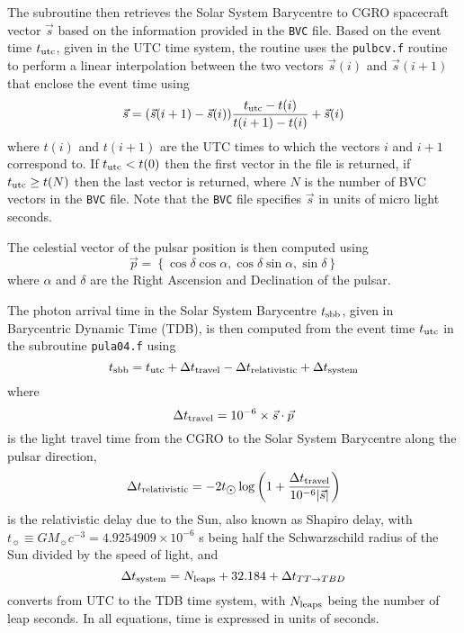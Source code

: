 \documentclass{article}[12pt,a4]
\begin{document}
The subroutine then retrieves the Solar System Barycentre to CGRO spacecraft vector $\vec{s}$ based on the
information provided in the {\tt BVC} file.
Based on the event time $t_{\rm utc}$, given in the UTC time system, the routine uses the {\tt pulbcv.f} routine
to perform a linear interpolation between the two vectors $\vec{s}(i)$ and $\vec{s}(i+1)$ that enclose the event
time using
\begin{equation}
\vec{s} = (\vec{s}(i+1) - \vec{s}(i)) \frac{t_{\rm utc} - t(i) }{t(i+1) - t(i)} + \vec{s}(i)
\end{equation}
where $t(i)$ and $t(i+1)$ are the UTC times to which the vectors $i$ and $i+1$ correspond to.
If $t_{\rm utc}<t(0)$ then the first vector in the file is returned, if $t_{\rm utc}\ge t(N)$ then the last vector
is returned, where $N$ is the number of BVC vectors in the {\tt BVC} file.
Note that the {\tt BVC} file specifies $\vec{s}$ in units of micro light seconds.

The celestial vector of the pulsar position is then computed using
\begin{equation}
\vec{p} = \left\{ \cos \delta \cos \alpha, \cos \delta \sin \alpha, \sin \delta \right\}
\end{equation}
where $\alpha$ and $\delta$ are the Right Ascension and Declination of the pulsar.

The photon arrival time in the Solar System Barycentre $t_{\rm sbb}$, given in Barycentric Dynamic
Time (TDB), is then computed from the event time $t_{\rm utc}$ in the subroutine {\tt pula04.f} using
\begin{equation}
t_{\rm sbb} = t_{\rm utc} + \Delta t_{\rm travel} - \Delta t_{\rm relativistic} + \Delta t_{\rm system}
\end{equation}
where
\begin{equation}
\Delta t_{\rm travel} = 10^{-6} \times \vec{s} \cdot \vec{p} 
\end{equation}
is the light travel time from the CGRO to the Solar System Barycentre along the pulsar direction,
\begin{equation}
\Delta t_{\rm relativistic} = -2 t_{\hbox{$\odot$}} \log \left( 1 + \frac{ \Delta t_{\rm travel} }{10^{-6} | \vec{s} |} \right)
\end{equation}
is the relativistic delay due to the Sun, also known as Shapiro delay, with 
$t_{\sun} \equiv G M_{\sun} c^{-3} = 4.9254909 \times 10^{-6}$ s 
being half the Schwarzschild radius of the Sun divided by the speed of light, and
\begin{equation}
\Delta t_{\rm system} = N_{\rm leaps} + 32.184 + \Delta t_{TT \to TBD}
\end{equation}
converts from UTC to the TDB time system, with $N_{\rm leaps}$ being the number of leap seconds.
In all equations, time is expressed in units of seconds.
\end{document}
